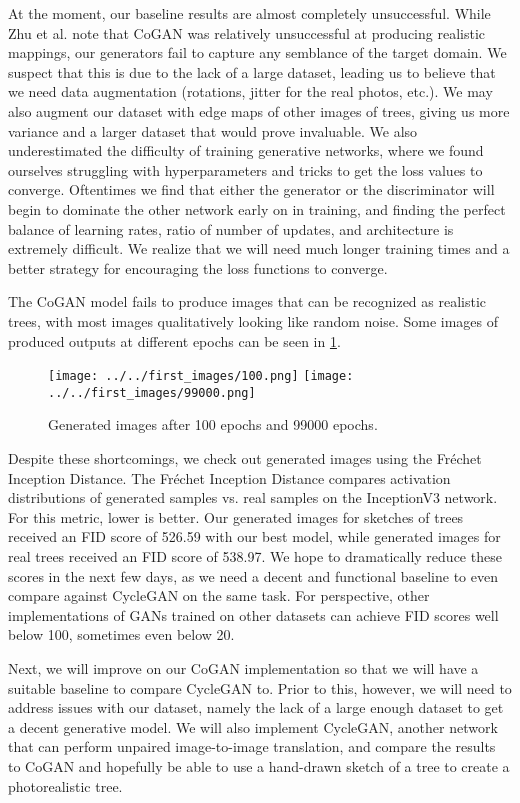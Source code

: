 \documentclass[10pt,twocolumn,letterpaper]{article}
\begin{document}
At the moment, our baseline results are almost completely unsuccessful.
While Zhu et al. \cite{cycleGAN} note that CoGAN was relatively unsuccessful at producing realistic mappings, our generators fail to capture any semblance of the target domain.
We suspect that this is due to the lack of a large dataset, leading us to believe that we need data augmentation (rotations, jitter for the real photos, etc.).
We may also augment our dataset with edge maps of other images of trees, giving us more variance and a larger dataset that would prove invaluable.
We also underestimated the difficulty of training generative networks, where we found ourselves struggling with hyperparameters and tricks to get the loss values to converge.
Oftentimes we find that either the generator or the discriminator will begin to dominate the other network early on in training, and finding the perfect balance of learning rates, ratio of number of updates, and architecture is extremely difficult.
We realize that we will need much longer training times and a better strategy for encouraging the loss functions to converge.

The CoGAN model fails to produce images that can be recognized as realistic trees, with most images qualitatively looking like random noise.
Some images of produced outputs at different epochs can be seen in \ref{cogan_pics}.

\begin{figure}
  \texttt{[image: ../../first\_images/100.png]}
  \texttt{[image: ../../first\_images/99000.png]}
  \caption{Generated images after 100 epochs and 99000 epochs.}
  \label{cogan_pics}
\end{figure}

Despite these shortcomings, we check out generated images using the Fr\'echet Inception Distance.
The Fr\'echet Inception Distance compares activation distributions of generated samples vs. real samples on the InceptionV3 network.
For this metric, lower is better.
Our generated images for sketches of trees received an FID score of 526.59 with our best model, while generated images for real trees received an FID score of 538.97.
We hope to dramatically reduce these scores in the next few days, as we need a decent and functional baseline to even compare against CycleGAN on the same task.
For perspective, other implementations of GANs trained on other datasets can achieve FID scores well below 100, sometimes even below 20.

Next, we will improve on our CoGAN implementation so that we will have a suitable baseline to compare CycleGAN to.
Prior to this, however, we will need to address issues with our dataset, namely the lack of a large enough dataset to get a decent generative model.
We will also implement CycleGAN, another network that can perform unpaired image-to-image translation, and compare the results to CoGAN and hopefully be able to use a hand-drawn sketch of a tree to create a photorealistic tree.
{\small


}
\end{document}
